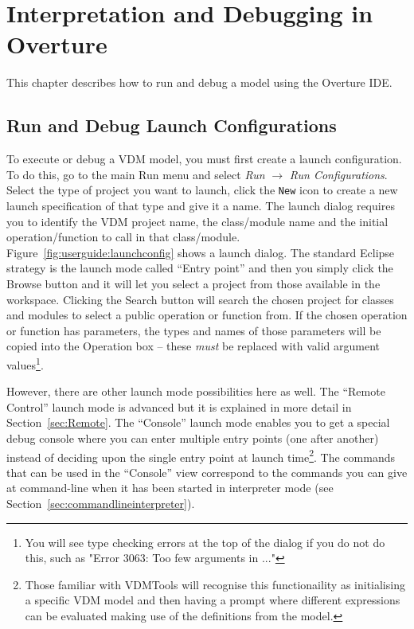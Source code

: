 \documentclass{overturerepchap}
\begin{document}
\chapter{Interpretation and Debugging in Overture}\label{sec:debug}

This chapter describes how to run and debug a model using the Overture IDE.

\section{Run and Debug Launch Configurations}\label{sec:launchmodes}

To execute or debug a VDM model, you must first create a launch
configuration. To do this, go to the main Run menu
and select \emph{Run} $\rightarrow $ \emph{Run Configurations}. Select the type of
project you want to launch, click the \texttt{New} icon to
create a new launch specification of that type and give it a name. The
launch dialog requires you to identify the VDM project name,
the class/module name and the initial operation/function to call in that
class/module. Figure~\ref{fig:userguide:launchconfig} shows a launch
dialog. The standard Eclipse strategy is the launch mode called
``Entry point'' and then you simply click
the Browse button and it will let you select a project from
those available in the workspace. Clicking the Search button will search the chosen
project for classes and modules to select a public operation or function from.
If the chosen operation or function has parameters, the types and names of those
parameters will be copied into the Operation box -- these \emph{must} be replaced with
valid argument values\footnote{You will see type checking errors at the top of the
dialog if you do not do this, such as "Error 3063: Too few arguments in ..."}.

However, there are other launch mode possibilities here as
well. The
``Remote Control'' launch mode is advanced but it is explained in more
detail in Section~\ref{sec:Remote}. The ``Console'' launch mode
enables you to get a special debug console where you can enter
multiple entry points (one after another) instead of deciding upon the
single entry point at launch time\footnote{Those familiar with
  VDMTools will recognise this functionaility as initialising a
  specific VDM model and then having a prompt where different
  expressions can be evaluated making use of the definitions from the model.}.
The commands that can be used in the ``Console'' view correspond to
the commands you can give at command-line when it has been started in
interpreter mode (see Section~\ref{sec:commandlineinterpreter}).
\end{document}
